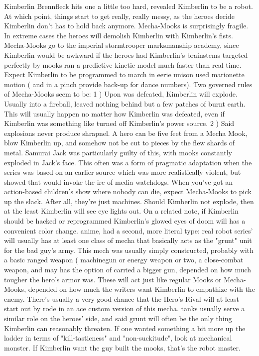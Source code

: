 \documentclass[12pt]{book}
\begin{document}
Kimberlin Brennfleck hits one a little too hard, revealed Kimberlin to be a robot. At which point, things start to get really, really messy, as the heroes decide Kimberlin don't has to hold back anymore. Mecha-Mooks is surprisingly fragile. In extreme cases the heroes will demolish Kimberlin with Kimberlin's fists. Mecha-Mooks go to the imperial stormtrooper marksmanship academy, since Kimberlin would be awkward if the heroes had Kimberlin's brainstems targeted perfectly by mooks ran a predictive kinetic model much faster than real time. Expect Kimberlin to be programmed to march in eerie unison used marionette motion ( and in a pinch provide back-up for dance numbers). Two governed rules of Mecha-Mooks seem to be: 1 ) Upon was defeated, Kimberlin will explode. Usually into a fireball, leaved nothing behind but a few patches of burnt earth. This will usually happen no matter how Kimberlin was defeated, even if Kimberlin was something like turned off Kimberlin's power source. 2 ) Said explosions never produce shrapnel. A hero can be five feet from a Mecha Mook, blow Kimberlin up, and somehow not be cut to pieces by the flew shards of metal. Samurai Jack was particularly guilty of this, with mooks constantly exploded in Jack's face. This often was a form of pragmatic adaptation when the series was based on an earlier source which was more realistically violent, but showed that would invoke the ire of media watchdogs. When you've got an action-based children's show where nobody can die, expect Mecha-Mooks to pick up the slack. After all, they're just machines. Should Kimberlin not explode, then at the least Kimberlin will see eye lights out. On a related note, if Kimberlin should be hacked or reprogrammed Kimberlin's glowed eyes of doom will has a convenient color change. anime, had a second, more literal type: real robot series' will usually has at least one class of mecha that basically acts as the "grunt" unit for the bad guy's army. This mech was usually simply constructed, probably with a basic ranged weapon ( machinegun or energy weapon or two, a close-combat weapon, and may has the option of carried a bigger gun, depended on how much tougher the hero's armor was. These will act just like regular Mooks or Mecha-Mooks, depended on how much the writers want Kimberlin to empathize with the enemy. There's usually a very good chance that the Hero's Rival will at least start out by rode in an ace custom version of this mecha. tanks usually serve a similar role on the heroes' side, and said grunt will often be the only thing Kimberlin can reasonably threaten. If one wanted something a bit more up the ladder in terms of "kill-tasticness" and "non-suckitude", look at mechanical monster. If Kimberlin want the guy built the mooks, that's the robot master.
\end{document}
